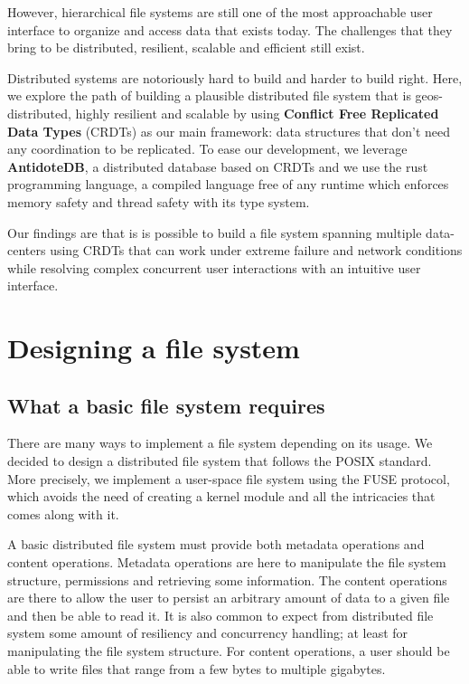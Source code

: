 \documentclass[sigplan, 10pt]{acmart}
\begin{document}
However, hierarchical file systems are still one of the most approachable
user interface to organize and access data that exists today.
The challenges that they bring to be distributed, resilient, scalable
and efficient still exist.

Distributed systems are notoriously hard to build and harder to
build right. Here, we explore the path of building a plausible distributed file
system that is geos-distributed, highly resilient and scalable by using
\textbf{Conflict Free Replicated Data Types} (CRDTs) as our main framework:
data structures that don't need any coordination to be replicated. To ease our
development, we leverage \textbf{AntidoteDB}, a distributed database based
on CRDTs and we use the rust programming language,
a compiled language free of any runtime which enforces memory safety and
thread safety with its type system.

Our findings are that is is possible to build a file system spanning multiple
data-centers using CRDTs that can work under extreme failure and network conditions while
resolving complex concurrent user interactions with an intuitive user interface.

\section{Designing a file system}

\subsection{What a basic file system requires}

There are many ways to implement a file system depending on its usage. We
decided to design a distributed file system that follows  the POSIX standard.
More precisely, we implement a user-space file system using the FUSE protocol,
which avoids the need of creating a kernel module and all the intricacies
that comes along with it.

A basic distributed file system must provide both metadata operations and
content operations. Metadata operations are here to manipulate the file system
structure, permissions and retrieving some information. The content operations
are there to allow the user to persist an arbitrary amount of data to a given
file and then be able to read it.
It is also common to expect from distributed file system some amount
of resiliency and concurrency handling; at least for manipulating the
file system structure. For content operations,
a user should be able to write files that range from
a few bytes to multiple gigabytes.
\end{document}

